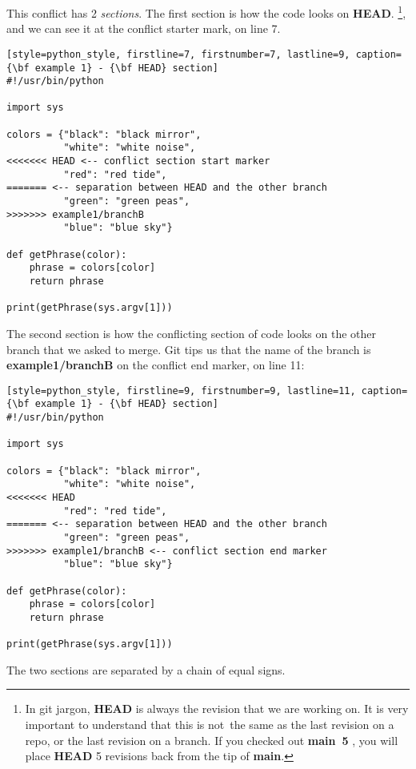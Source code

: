 This conflict has 2 {\it sections}. The first section is how the code looks on {\bf HEAD}.
\footnote{In git jargon, {\bf HEAD} is always the revision that we are working on. It is very important to understand
that this is not the same as the last revision on a repo, or the last revision on a branch. If you checked out {\bf main~5}
, you will place {\bf HEAD} 5 revisions back from the tip of {\bf main}.}, and we can see it at the conflict starter mark, on
line 7.

\begin{lstlisting}[style=python_style, firstline=7, firstnumber=7, lastline=9, caption={\bf example 1} - {\bf HEAD} section]
#!/usr/bin/python

import sys

colors = {"black": "black mirror",
          "white": "white noise",
<<<<<<< HEAD <-- conflict section start marker
          "red": "red tide",
======= <-- separation between HEAD and the other branch
          "green": "green peas",
>>>>>>> example1/branchB
          "blue": "blue sky"}

def getPhrase(color):
    phrase = colors[color]
    return phrase

print(getPhrase(sys.argv[1]))
\end{lstlisting}

The second section is how the conflicting section of code looks on the other branch that we asked to merge.
Git tips us that the name of the branch is {\bf example1/branchB} on the conflict end marker, on line 11:

\begin{lstlisting}[style=python_style, firstline=9, firstnumber=9, lastline=11, caption={\bf example 1} - {\bf HEAD} section]
#!/usr/bin/python

import sys

colors = {"black": "black mirror",
          "white": "white noise",
<<<<<<< HEAD
          "red": "red tide",
======= <-- separation between HEAD and the other branch
          "green": "green peas",
>>>>>>> example1/branchB <-- conflict section end marker
          "blue": "blue sky"}

def getPhrase(color):
    phrase = colors[color]
    return phrase

print(getPhrase(sys.argv[1]))
\end{lstlisting}

The two sections are separated by a chain of equal signs.



